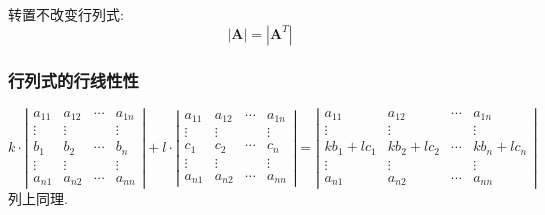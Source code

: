 \documentclass{article}
\begin{document}
				转置不改变行列式:
				$$
				\left| \boldsymbol{A}\right| = \left| \boldsymbol{A}^{T}\right|
				$$
			\subsubsection*{行列式的行线性性}
				$$
				k\cdot\left|\begin{array}{cccc}
					a_{11} & a_{12} & \cdots & a_{1 n} \\
					\vdots & \vdots & & \vdots \\
					b_{1} & b_{2} & \cdots & b_{n} \\
					\vdots & \vdots & & \vdots \\
					a_{n 1} & a_{n 2} & \cdots & a_{n n}
				\end{array}\right|+
				l\cdot\left|\begin{array}{cccc}
					a_{11} & a_{12} & \cdots & a_{1 n} \\
					\vdots & \vdots & & \vdots \\
					c_{1} & c_{2} & \cdots & c_{n} \\
					\vdots & \vdots & & \vdots \\
					a_{n 1} & a_{n 2} & \cdots & a_{n n}
				\end{array}\right|
				=\left|\begin{array}{cccc}
					a_{11} & a_{12} & \cdots & a_{1 n} \\
					\vdots & \vdots & & \vdots \\
					kb_{1}+lc_{1} & kb_{2}+lc_{2} & \cdots & kb_{n}+lc_{n} \\
					\vdots & \vdots & & \vdots \\
					a_{n 1} & a_{n 2} & \cdots & a_{n n}
				\end{array}\right|
				$$
				列上同理.
\end{document}
